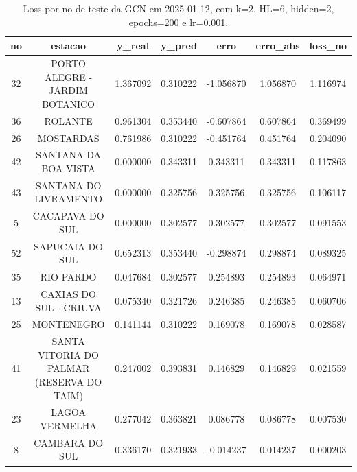 \begin{table}[h]
\centering
\caption{Loss por no de teste da GCN em 2025-01-12, com k=2, HL=6, hidden=2, epochs=200 e lr=0.001.}
\label{tab:gcn_loss_k2_hl6_h2_e200_d20250112}
\begin{tabular}{ccccccc}
\toprule
no & estacao & y\_real & y\_pred & erro & erro\_abs & loss\_no \\
\midrule
32 & PORTO ALEGRE - JARDIM BOTANICO & 1.367092 & 0.310222 & -1.056870 & 1.056870 & 1.116974 \\
36 & ROLANTE & 0.961304 & 0.353440 & -0.607864 & 0.607864 & 0.369499 \\
26 & MOSTARDAS & 0.761986 & 0.310222 & -0.451764 & 0.451764 & 0.204090 \\
42 & SANTANA DA BOA VISTA & 0.000000 & 0.343311 & 0.343311 & 0.343311 & 0.117863 \\
43 & SANTANA DO LIVRAMENTO & 0.000000 & 0.325756 & 0.325756 & 0.325756 & 0.106117 \\
5 & CACAPAVA DO SUL & 0.000000 & 0.302577 & 0.302577 & 0.302577 & 0.091553 \\
52 & SAPUCAIA DO SUL & 0.652313 & 0.353440 & -0.298874 & 0.298874 & 0.089325 \\
35 & RIO PARDO & 0.047684 & 0.302577 & 0.254893 & 0.254893 & 0.064971 \\
13 & CAXIAS DO SUL - CRIUVA & 0.075340 & 0.321726 & 0.246385 & 0.246385 & 0.060706 \\
25 & MONTENEGRO & 0.141144 & 0.310222 & 0.169078 & 0.169078 & 0.028587 \\
41 & SANTA VITORIA DO PALMAR (RESERVA DO TAIM) & 0.247002 & 0.393831 & 0.146829 & 0.146829 & 0.021559 \\
23 & LAGOA VERMELHA & 0.277042 & 0.363821 & 0.086778 & 0.086778 & 0.007530 \\
8 & CAMBARA DO SUL & 0.336170 & 0.321933 & -0.014237 & 0.014237 & 0.000203 \\
\bottomrule
\end{tabular}
\end{table}
